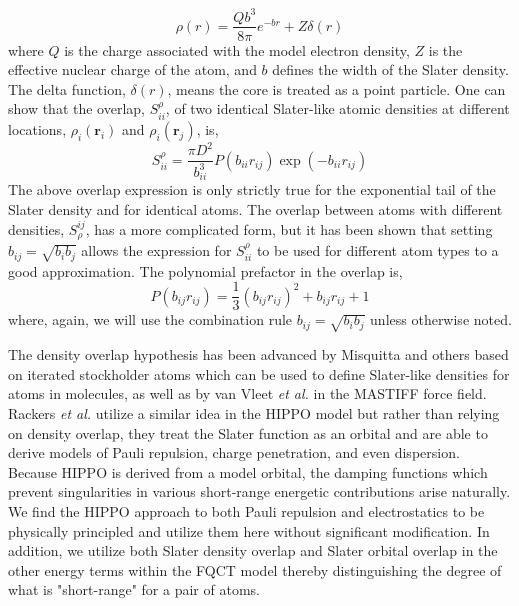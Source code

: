 \documentclass[journal=jctcce,manuscript=article]{achemso}
\begin{document}
\begin{equation}
  \rho(r)=\frac{Qb^3}{8\pi}e^{-br}+Z\delta(r)
  \label{eq:slater}
\end{equation}
\noindent
where $Q$ is the charge associated with the model electron density, $Z$ is the effective nuclear charge of the atom, and $b$ defines the width of the Slater density. The delta function, $\delta(r)$, means the core is treated as a point particle. One can show that the overlap, $S_{ii}^\rho$, of two identical Slater-like atomic densities at different locations, $\rho_i(\bm{r}_i)$ and $\rho_i(\bm{r}_j)$, is,
\begin{equation}
  S_{ii}^\rho=\frac{\pi D^2}{b_{ii}^3}P(b_{ii}r_{ij})\exp(-b_{ii}r_{ij})
\end{equation}
The above overlap expression is only strictly true for the exponential tail of the Slater density and for identical atoms. The overlap between atoms with different densities, $S^{ij}_\rho$, has a more complicated form, but it has been shown that setting $b_{ij}=\sqrt{b_ib_j}$ allows the expression
for $S_{ii}^\rho$ to be used for different atom types to a good
approximation\cite{van2016beyond}. The polynomial prefactor in the overlap is,
\begin{equation}
  P(b_{ij}r_{ij})=\frac13(b_{ij}r_{ij})^2 + b_{ij}r_{ij}+1
\end{equation}
where, again, we will use the combination rule $b_{ij}=\sqrt{b_ib_j}$ unless otherwise noted.

The density overlap hypothesis has been advanced by Misquitta and others\cite{misquitta2014distributed,misquitta2018isa} based on iterated stockholder atoms which can be used to define Slater-like densities for atoms in molecules, as well as by van Vleet \textit{et al.} in the MASTIFF force field.\cite{van2016beyond,van2018new} Rackers \textit{et al.} utilize a similar idea in the HIPPO model\cite{rackers2021polarizable} but rather than relying on density overlap, they treat the Slater function as an orbital and are able to derive models of Pauli repulsion, charge penetration, and even dispersion. Because HIPPO is derived from a model orbital, the damping functions which prevent singularities in various short-range energetic contributions arise naturally. We find the HIPPO approach to both Pauli repulsion and electrostatics to be physically principled and utilize them here without significant modification. In addition, we utilize both Slater density overlap and Slater orbital overlap in the other energy terms within the FQCT model thereby distinguishing the degree of what is "short-range" for a pair of atoms. 
\end{document}
